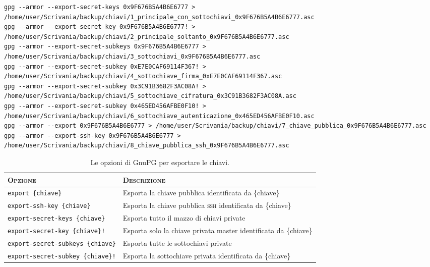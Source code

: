 \begin{lstlisting}
gpg --armor --export-secret-keys 0x9F676B5A4B6E6777 > /home/user/Scrivania/backup/chiavi/1_principale_con_sottochiavi_0x9F676B5A4B6E6777.asc
gpg --armor --export-secret-key 0x9F676B5A4B6E6777! > /home/user/Scrivania/backup/chiavi/2_principale_soltanto_0x9F676B5A4B6E6777.asc
gpg --armor --export-secret-subkeys 0x9F676B5A4B6E6777 > /home/user/Scrivania/backup/chiavi/3_sottochiavi_0x9F676B5A4B6E6777.asc
gpg --armor --export-secret-subkey 0xE7E0CAF69114F367! > /home/user/Scrivania/backup/chiavi/4_sottochiave_firma_0xE7E0CAF69114F367.asc
gpg --armor --export-secret-subkey 0x3C91B3682F3AC08A! > /home/user/Scrivania/backup/chiavi/5_sottochiave_cifratura_0x3C91B3682F3AC08A.asc
gpg --armor --export-secret-subkey 0x465ED456AFBE0F10! > /home/user/Scrivania/backup/chiavi/6_sottochiave_autenticazione_0x465ED456AFBE0F10.asc
gpg --armor --export 0x9F676B5A4B6E6777 > /home/user/Scrivania/backup/chiavi/7_chiave_pubblica_0x9F676B5A4B6E6777.asc
gpg --armor --export-ssh-key 0x9F676B5A4B6E6777 > /home/user/Scrivania/backup/chiavi/8_chiave_pubblica_ssh_0x9F676B5A4B6E6777.asc
\end{lstlisting}

\begin{table}
    \centering
	\begin{tabularx}{\textwidth}{l p{5cm}}
 		\toprule
		\textsc{Opzione} & \textsc{Descrizione} \\
		\midrule
		\texttt{export \{chiave\}}                & Esporta la chiave pubblica identificata da \{chiave\}              \\
		\texttt{export-ssh-key \{chiave\}}        & Esporta la chiave pubblica \textsc{ssh} identificata da \{chiave\} \\
		\texttt{export-secret-keys \{chiave\}}    & Esporta tutto il mazzo di chiavi private                           \\
		\texttt{export-secret-key \{chiave\}!}    & Esporta solo la chiave privata master identificata da \{chiave\}   \\
		\texttt{export-secret-subkeys \{chiave\}} & Esporta tutte le sottochiavi private                               \\
		\texttt{export-secret-subkey \{chiave\}!} & Esporta la sottochiave privata identificata da \{chiave\}          \\
		\bottomrule
	\end{tabularx}
	\caption{Le opzioni di GnuPG per esportare le chiavi.}
	\label{table:exportkeys}
\end{table}

